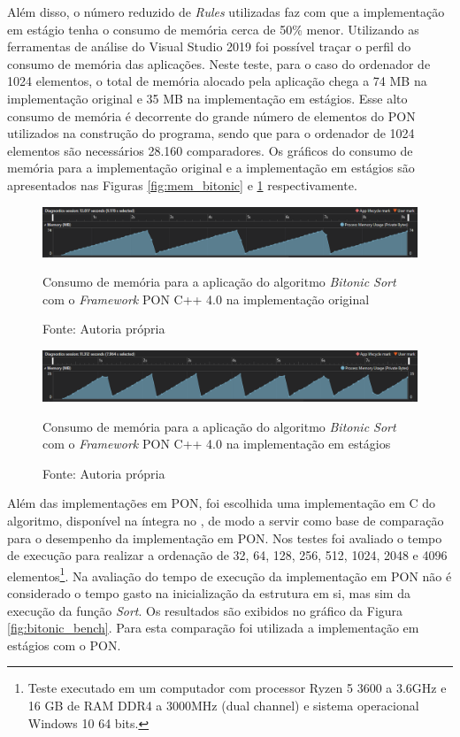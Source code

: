 Além disso, o número reduzido de \textit{Rules} utilizadas faz com que a
implementação em estágio tenha o consumo de memória cerca de 50\% menor.
Utilizando as ferramentas de análise do Visual Studio 2019 foi possível traçar o
perfil do consumo de memória das aplicações. Neste teste, para o caso do
ordenador de 1024 elementos, o total de memória alocado pela aplicação chega a
74 MB na implementação original e 35 MB na implementação em estágios. Esse alto
consumo de memória é decorrente do grande número de elementos do PON utilizados
na construção do programa, sendo que para o ordenador de 1024 elementos são
necessários 28.160 comparadores. Os gráficos do consumo de memória para a
implementação original e a implementação em estágios são apresentados nas
Figuras \ref{fig:mem_bitonic} e \ref{fig:mem_bitonic_nop_old} respectivamente.

\begin{figure}[!htb]
\centering
\includegraphics[width=\textwidth]{../figures/mem_bitonic.png}
\caption{Consumo de memória para a aplicação do algoritmo \textit{Bitonic Sort}
com o \textit{Framework} PON C++ 4.0 na implementação original}
\smallskip
\caption*{Fonte: Autoria própria}
\label{fig:mem_bitonic}
\smallskip
\includegraphics[width=\textwidth]{../figures/mem_bitonic_nop_old.png}
\caption{Consumo de memória para a aplicação do algoritmo \textit{Bitonic Sort}
com o \textit{Framework} PON C++ 4.0 na implementação em estágios}
\smallskip
\caption*{Fonte: Autoria própria}
\label{fig:mem_bitonic_nop_old}
\end{figure}

Além das implementações em PON, foi escolhida uma implementação em C do
algoritmo, disponível na íntegra no \cite{pitsianis_2008}, de modo a
servir como base de comparação para o desempenho da implementação em PON. Nos
testes foi avaliado o tempo de execução para realizar a ordenação de 32, 64,
128, 256, 512, 1024, 2048 e 4096 elementos\footnote{Teste executado em um
computador com processor Ryzen 5 3600 a 3.6GHz e 16 GB de RAM DDR4 a 3000MHz
(dual channel) e sistema operacional Windows 10 64 bits.}. Na avaliação do tempo
de execução da implementação em PON não é considerado o tempo gasto na
inicialização da estrutura em si, mas sim da execução da função \textit{Sort}.
Os resultados são exibidos no gráfico da Figura \ref{fig:bitonic_bench}. Para
esta comparação foi utilizada a implementação em estágios com o PON.

